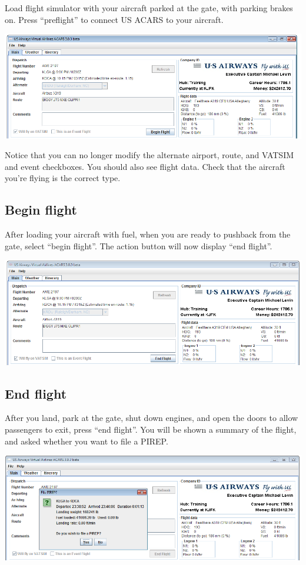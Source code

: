 \documentclass[12pt]{article}
\begin{document}
Load flight simulator with your aircraft parked at the gate, with parking brakes on. Press “preflight” to connect US ACARS to your aircraft.

\begin{center}
\includegraphics[scale=1]{Image14.pdf}
\end{center} 

Notice that you can no longer modify the alternate airport, route, and VATSIM and event checkboxes. You should also see flight data. Check that the aircraft you’re flying is the correct type.

\subsection{Begin flight}
After loading your aircraft with fuel, when you are ready to pushback from the gate, select “begin flight”. The action button will now display “end flight”.

\begin{center}
\includegraphics[scale=1]{Image15.pdf}
\end{center} 

\subsection{End flight}
After you land, park at the gate, shut down engines, and open the doors to allow passengers to exit, press “end flight”. You will be shown a summary of the flight, and asked whether you want to file a PIREP.

\begin{center}
\includegraphics[scale=1]{Image16.pdf}
\end{center} 
\end{document}
